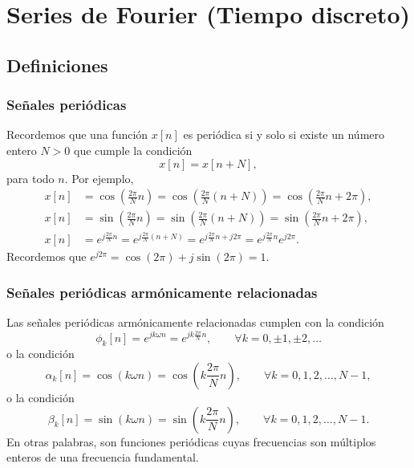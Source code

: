 \chapter{Series de Fourier (Tiempo discreto)}

\section{Definiciones}

\subsection{Señales periódicas}

Recordemos que una función $x[n]$ es periódica si y solo si existe un número entero $N > 0$ que cumple la condición
\begin{equation}
	x[n] = x[n+N],
\end{equation}
para todo $n$. Por ejemplo, 
\begin{align}
	x[n] &= \cos \left(\frac{2\pi}{N} n\right) = \cos\left(\frac{2\pi}{N} (n + N)\right) = \cos \left(\frac{2\pi}{N} n + 2\pi\right),\\
	x[n] &= \sin \left(\frac{2\pi}{N} n\right) = \sin\left(\frac{2\pi}{N} (n+N)\right) = \sin \left(\frac{2\pi}{N} n + 2\pi\right), \\
	x[n] &= e^{j\frac{2\pi}{N} n} = e^{j\frac{2\pi}{N} (n + N)} = e^{j\frac{2\pi}{N}n + j2\pi} = e^{j\frac{2\pi}{N}n} e^{j2\pi}.
\end{align}
Recordemos que $e^{j2\pi} = \cos(2\pi) + j\sin(2\pi) = 1$.

\subsection{Señales periódicas armónicamente relacionadas}

Las señales periódicas armónicamente relacionadas cumplen con la condición
\begin{equation}
	\phi_{k}[n] = e^{jk\omega n} = e^{jk\frac{2\pi}{N}n}, \qquad \forall k=0, \pm 1, \pm 2, \dots  \label{NHar}
\end{equation}
o la condición
\begin{equation}
	\alpha_{k}[n] = \cos(k\omega n) = \cos \left(k\frac{2\pi}{N}n\right), \qquad \forall k=0, 1, 2, \dots, N - 1, 
\end{equation}
o la condición
\begin{equation}
	\beta_{k}[n] = \sin(k\omega n) = \sin \left(k\frac{2\pi}{N}n\right), \qquad \forall k=0, 1, 2, \dots, N - 1.
\end{equation}
En otras palabras, son funciones periódicas cuyas frecuencias son múltiplos enteros de una frecuencia fundamental.

